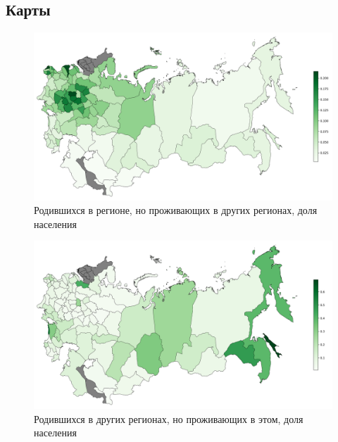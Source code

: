\documentclass[a4paper,12pt]{article}
\begin{document}
\begin{landscape}

\section{Карты}

\begin{figure}[h!]
	\includegraphics[height=0.85\textwidth]{pics/mig_of_pop_from.png}
	\caption{Родившихся в регионе, но проживающих в других регионах, доля населения}
	\label{fig:image1}
\end{figure}
	
\begin{figure}[h!]
	\includegraphics[height=0.85\textwidth]{pics/mig_of_pop_to.png}
	\caption{Родившихся в других регионах, но проживающих в этом, доля населения}
	\label{fig:image1}
\end{figure}

\end{landscape}
\end{document}

